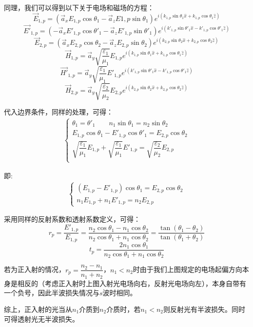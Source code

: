 \begin{prove}
  同理，我们可以得到以下关于电场和磁场的方程：
  \[\vec{E}_{1,p} = (\vec{a}_x E_{1,p} \cos\theta_1 - \vec{a}_z E{1,p}\sin\theta_1) e^{i(k_{1,p}\sin\theta_1 \hat{x} + k_{1,p}\cos\theta_1 \hat{z})}\]
  \[\vec{E'}_{1,p} = (-\vec{a}_x E'_{1,p} \cos\theta'_1 - \vec{a}_z E'_{1,p}\sin\theta'_1) e^{i(k'_{1,p}\sin\theta'_1 \hat{x} - k'_{1,p}\cos\theta'_1 \hat{z})}\]
  \[\vec{E}_{2,p} = (\vec{a}_x E_{2,p} \cos\theta_2 - \vec{a}_z E_{2,p}\sin\theta_2) e^{i(k_{2,p}\sin\theta_2 \hat{x} + k_{2,p}\cos\theta_2 \hat{z})}\]
  \[\vec{H}_{1,p} = \vec{a}_y \sqrt{\dfrac{\varepsilon_1}{\mu_1}} E_{1,p} e^{i(k_{1,p}\sin\theta_1 \hat{x} + k_{1,p}\cos\theta_1 \hat{z})}\]
  \[\vec{H'}_{1,p} = \vec{a}_y \sqrt{\dfrac{\varepsilon_1}{\mu_1}} E'_{1,p} e^{i(k'_{1,p}\sin\theta'_1 \hat{x} - k'_{1,p}\cos\theta'_1 \hat{z})}\]
  \[\vec{H}_{2,p} = \vec{a}_y \sqrt{\dfrac{\varepsilon_2}{\mu_2}} E_{2,p} e^{i(k_{2,p}\sin\theta_2 \hat{x} + k_{2,p}\cos\theta_2 \hat{z})}\]

  代入边界条件，同样的处理，可得：
  \begin{align*}
    \begin{cases}
      \theta_1 = \theta'_1\qquad n_1\sin\theta_1 = n_2\sin\theta_2\\
      E_{1,p}\cos\theta_1 - E'_{1,p}\cos\theta'_1 = E_{2,p}\cos\theta_2\\
      \sqrt{\dfrac{\varepsilon_1}{\mu_1}}E_{1,p} + \sqrt{\dfrac{\varepsilon_1}{\mu_1}}E'_{1,p} = \sqrt{\dfrac{\varepsilon_2}{\mu_2}}E_{2,p}\\
    \end{cases}
  \end{align*}

  即:
  \begin{align*}
    \begin{cases}
      (E_{1,p} - E'_{1,p})\cos\theta_1 = E_{2,p}\cos\theta_2\\
      n_1 E_{1,p} + n_1 E'_{1,p} = n_2 E_{2,p}
    \end{cases}
  \end{align*}

  采用同样的反射系数和透射系数定义，可得：
  \[r_p = \dfrac{E'_{1,p}}{E_{1,p}} = \dfrac{n_2\cos\theta_1 - n_1\cos\theta_2}{n_2\cos\theta_1 + n_1\cos\theta_2} = \dfrac{\tan(\theta_1 - \theta_2)}{\tan(\theta_1 + \theta_2)}\]
  \[t_p = \dfrac{2 n_1 \cos\theta_1}{n_2\cos\theta_1 + n_1\cos\theta_2}\]

  若为正入射的情况，$r_p = \dfrac{n_2 - n_1}{n_1 + n_2}$，$n_1 < n_2$时由于我们上图规定的电场起偏方向本身是相反的（考虑正入射时上图入射光电场向右，反射光电场向左），本身自带有一个负号，因此半波损失情况与$s$波时相同。

  综上，正入射的光当从$n_1$介质到$n_2$介质时，若$n_1 < n_2$则反射光有半波损失。同时可得透射光无半波损失。
\end{prove}

